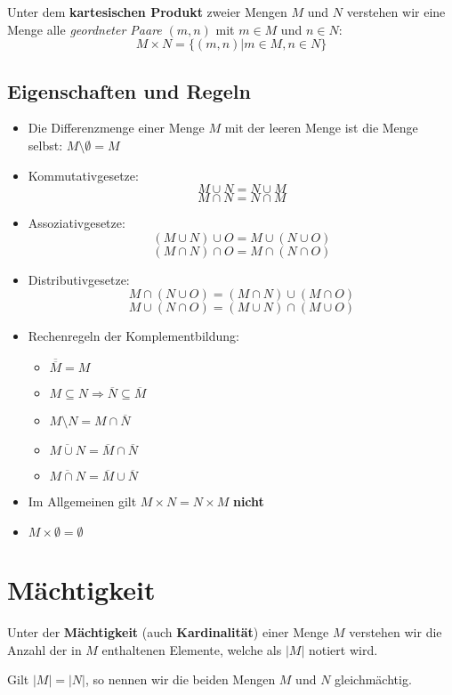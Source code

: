 \documentclass[../../main.tex]{subfiles}
\begin{document}
	\begin{definition}
		Unter dem \textbf{kartesischen Produkt} zweier Mengen $M$ und $N$ verstehen wir eine Menge alle \textit{geordneter Paare}  $(m, n)$ mit $m \in M$ und $n \in N$: $$M \times N = \{(m,n) | m \in M, n \in N \}$$
	\end{definition}

	\subsection*{Eigenschaften und Regeln}
	\begin{itemize}
		\item Die Differenzmenge einer Menge $M$ mit der leeren Menge ist die Menge selbst: $M \setminus \emptyset = M$
		\item Kommutativgesetze: $$M \cup N = N \cup M$$ $$M \cap N = N \cap M$$
		\item Assoziativgesetze: $$(M \cup N) \cup O = M \cup (N \cup O)$$ $$(M \cap N) \cap O = M \cap (N \cap O)$$
		\item Distributivgesetze: $$M \cap (N \cup O) = (M \cap N) \cup (M \cap O)$$ $$M \cup (N \cap O) = (M \cup N) \cap (M \cup O)$$
		\item Rechenregeln der Komplementbildung:
		\begin{itemize}
			\item $\overline{\overline{M}} = M$
			\item $M \subseteq N \Rightarrow \overline{N} \subseteq \overline{M}$
			\item $M \setminus N = M \cap \overline{N}$
			\item $\overline{M \cup N} = \overline{M} \cap \overline{N}$
			\item $\overline{M \cap N} = \overline{M} \cup \overline{N}$
		\end{itemize}
		\item Im Allgemeinen gilt $M \times N = N \times M$ \textbf{nicht}
		\item $M \times \emptyset = \emptyset$
	\end{itemize}

	\section{Mächtigkeit}
	
	\begin{definition}
		Unter der \textbf{Mächtigkeit} (auch \textbf{Kardinalität}) einer Menge $M$ verstehen wir die Anzahl der in $M$ enthaltenen Elemente, welche als $|M|$ notiert wird. 
	\end{definition}

	Gilt $|M| = |N|$, so nennen wir die beiden Mengen $M$ und $N$ gleichmächtig. 
	
	
\end{document}
